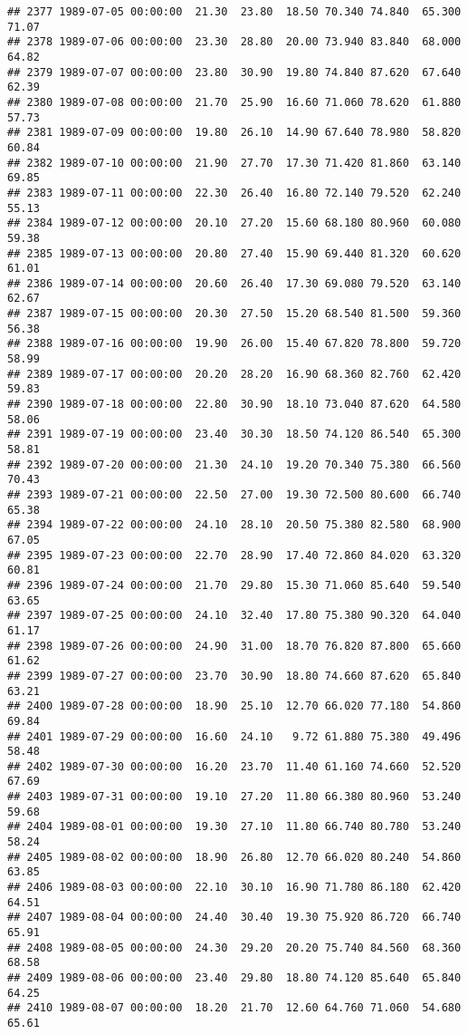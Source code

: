 \documentclass{article}\usepackage{graphicx, color}
\makeatletter
\newenvironment{kframe}{%
 \def\at@end@of@kframe{}%
 \ifinner\ifhmode%
  \def\at@end@of@kframe{\end{minipage}}%
  \begin{minipage}{\columnwidth}%
 \fi\fi%
 \def\FrameCommand##1{\hskip\@totalleftmargin \hskip-\fboxsep
 \colorbox{shadecolor}{##1}\hskip-\fboxsep
     \hskip-\linewidth \hskip-\@totalleftmargin \hskip\columnwidth}%
 \MakeFramed {\advance\hsize-\width
   \@totalleftmargin\z@ \linewidth\hsize
   \@setminipage}}%
 {\par\unskip\endMakeFramed%
 \at@end@of@kframe}
\newenvironment{knitrout}{}{} %
\makeatother
\begin{document}
\begin{knitrout}
\begin{kframe}
\begin{verbatim}
## 2377 1989-07-05 00:00:00  21.30  23.80  18.50 70.340 74.840  65.300  71.07
## 2378 1989-07-06 00:00:00  23.30  28.80  20.00 73.940 83.840  68.000  64.82
## 2379 1989-07-07 00:00:00  23.80  30.90  19.80 74.840 87.620  67.640  62.39
## 2380 1989-07-08 00:00:00  21.70  25.90  16.60 71.060 78.620  61.880  57.73
## 2381 1989-07-09 00:00:00  19.80  26.10  14.90 67.640 78.980  58.820  60.84
## 2382 1989-07-10 00:00:00  21.90  27.70  17.30 71.420 81.860  63.140  69.85
## 2383 1989-07-11 00:00:00  22.30  26.40  16.80 72.140 79.520  62.240  55.13
## 2384 1989-07-12 00:00:00  20.10  27.20  15.60 68.180 80.960  60.080  59.38
## 2385 1989-07-13 00:00:00  20.80  27.40  15.90 69.440 81.320  60.620  61.01
## 2386 1989-07-14 00:00:00  20.60  26.40  17.30 69.080 79.520  63.140  62.67
## 2387 1989-07-15 00:00:00  20.30  27.50  15.20 68.540 81.500  59.360  56.38
## 2388 1989-07-16 00:00:00  19.90  26.00  15.40 67.820 78.800  59.720  58.99
## 2389 1989-07-17 00:00:00  20.20  28.20  16.90 68.360 82.760  62.420  59.83
## 2390 1989-07-18 00:00:00  22.80  30.90  18.10 73.040 87.620  64.580  58.06
## 2391 1989-07-19 00:00:00  23.40  30.30  18.50 74.120 86.540  65.300  58.81
## 2392 1989-07-20 00:00:00  21.30  24.10  19.20 70.340 75.380  66.560  70.43
## 2393 1989-07-21 00:00:00  22.50  27.00  19.30 72.500 80.600  66.740  65.38
## 2394 1989-07-22 00:00:00  24.10  28.10  20.50 75.380 82.580  68.900  67.05
## 2395 1989-07-23 00:00:00  22.70  28.90  17.40 72.860 84.020  63.320  60.81
## 2396 1989-07-24 00:00:00  21.70  29.80  15.30 71.060 85.640  59.540  63.65
## 2397 1989-07-25 00:00:00  24.10  32.40  17.80 75.380 90.320  64.040  61.17
## 2398 1989-07-26 00:00:00  24.90  31.00  18.70 76.820 87.800  65.660  61.62
## 2399 1989-07-27 00:00:00  23.70  30.90  18.80 74.660 87.620  65.840  63.21
## 2400 1989-07-28 00:00:00  18.90  25.10  12.70 66.020 77.180  54.860  69.84
## 2401 1989-07-29 00:00:00  16.60  24.10   9.72 61.880 75.380  49.496  58.48
## 2402 1989-07-30 00:00:00  16.20  23.70  11.40 61.160 74.660  52.520  67.69
## 2403 1989-07-31 00:00:00  19.10  27.20  11.80 66.380 80.960  53.240  59.68
## 2404 1989-08-01 00:00:00  19.30  27.10  11.80 66.740 80.780  53.240  58.24
## 2405 1989-08-02 00:00:00  18.90  26.80  12.70 66.020 80.240  54.860  63.85
## 2406 1989-08-03 00:00:00  22.10  30.10  16.90 71.780 86.180  62.420  64.51
## 2407 1989-08-04 00:00:00  24.40  30.40  19.30 75.920 86.720  66.740  65.91
## 2408 1989-08-05 00:00:00  24.30  29.20  20.20 75.740 84.560  68.360  68.58
## 2409 1989-08-06 00:00:00  23.40  29.80  18.80 74.120 85.640  65.840  64.25
## 2410 1989-08-07 00:00:00  18.20  21.70  12.60 64.760 71.060  54.680  65.61

\end{verbatim}
\end{kframe}
\end{knitrout}
\end{document}
